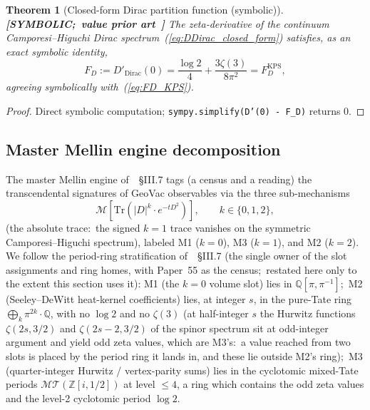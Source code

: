 \documentclass[11pt,a4paper]{article}
\theoremstyle{plain}
\newtheorem{theorem}{Theorem}[section]
\theoremstyle{definition}
\newcommand{\Z}{\mathbb{Z}}
\newcommand{\Q}{\mathbb{Q}}
\newcommand{\Tr}{\mathrm{Tr}}
\newcommand{\KPS}{\text{KPS}}
\begin{document}
\begin{theorem}[Closed-form Dirac partition function (symbolic)]
\label{thm:dirac_bitexact}
\textbf{[SYMBOLIC;\ value prior art~\cite{klebanov_pufu_safdi2011}]}
The zeta-derivative of the continuum Camporesi--Higuchi Dirac
spectrum~(\ref{eq:DDirac_closed_form}) satisfies, as an exact
symbolic identity,
\begin{equation}
F_{D} := D'_{\mathrm{Dirac}}(0) = \frac{\log 2}{4} + \frac{3\zeta(3)}{8\pi^{2}} = F_{D}^{\KPS},
\end{equation}
agreeing symbolically with~(\ref{eq:FD_KPS}).
\end{theorem}

\begin{proof}
Direct symbolic computation; \texttt{sympy.simplify(D'(0) - F\_D)}
returns $0$.
\end{proof}

\subsection{Master Mellin engine decomposition}

The master Mellin engine of~\cite{paper18}~\S III.7 tags (a census and a
reading) the transcendental signatures of GeoVac observables via the three
sub-mechanisms
\[
\mathcal{M}[\Tr(|D|^{k} \cdot e^{-t D^{2}})], \qquad k \in \{0, 1, 2\},
\]
(the absolute trace:\ the signed $k = 1$ trace vanishes on the symmetric
Camporesi--Higuchi spectrum),
labeled M1 ($k = 0$), M3 ($k = 1$), and M2 ($k = 2$). We follow the
period-ring stratification of~\cite{paper18}~\S III.7 (the single owner
of the slot assignments and ring homes, with Paper~55 as the census;\
restated here only to the extent this section uses it): M1 (the $k=0$
volume slot) lies in $\Q[\pi, \pi^{-1}]$;\ M2 (Seeley--DeWitt
heat-kernel coefficients) lies, at integer $s$, in the pure-Tate ring
$\bigoplus_{k} \pi^{2k} \cdot \Q$, with no $\log 2$ and no $\zeta(3)$
(at half-integer $s$ the Hurwitz functions $\zeta(2s, 3/2)$ and
$\zeta(2s-2, 3/2)$ of the spinor spectrum sit at odd-integer argument and
yield odd zeta values, which are M3's:\ a value reached from two slots
is placed by the period ring it lands in, and these lie outside M2's
ring);\
M3 (quarter-integer Hurwitz / vertex-parity sums) lies
in the cyclotomic mixed-Tate periods $\mathcal{MT}(\Z[i, 1/2])$ at level
$\le 4$, a ring which contains the odd zeta values and the level-2
cyclotomic period $\log 2$.
\end{document}
